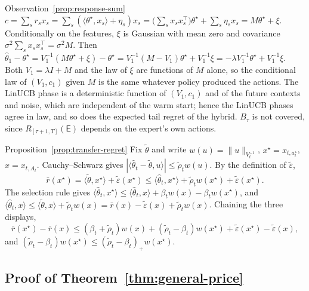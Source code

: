 \documentclass[anon]{alt2027} %
\newcommand{\Exp}{\mathsf{E}}
\newcommand{\wid}{w}
\begin{document}
\begin{proofof}{Observation~\ref{prop:response-sum}}
$c=\sum_sr_sx_s=\sum_s(\langle\theta^\star,x_s\rangle+\eta_s)x_s
=\bigl(\sum_sx_sx_s^\top\bigr)\theta^\star+\sum_s\eta_sx_s=M\theta^\star+\xi$.
Conditionally on the features, $\xi$ is Gaussian with mean zero and covariance
$\sigma^2\sum_sx_sx_s^\top=\sigma^2M$. Then
$\widehat\theta_1-\theta^\star=V_1^{-1}(M\theta^\star+\xi)-\theta^\star
=V_1^{-1}(M-V_1)\theta^\star+V_1^{-1}\xi=-\lambda V_1^{-1}\theta^\star+V_1^{-1}\xi$.
Both $V_1=\lambda I+M$ and the law of $\xi$ are functions of $M$ alone, so the
conditional law of $(V_1,c_1)$ given $M$ is the same whatever policy produced
the actions. The LinUCB phase is a deterministic function of $(V_1,c_1)$ and of
the future contexts and noise, which are independent of the warm start; hence
the LinUCB phases agree in law, and so does the expected tail regret of the
hybrid. $B_\tau$ is not covered, since $R_{[\tau+1,T]}(\Exp)$ depends on the
expert's own actions.
\end{proofof}

\begin{proofof}{Proposition~\ref{prop:transfer-regret}}
Fix $\widetilde\theta$ and write $\wid(u)=\|u\|_{V_t^{-1}}$,
$x^\star=x_{t,a^\star_t}$, $x=x_{t,A_t}$. Cauchy--Schwarz gives
$|\langle\widehat\theta_t-\widetilde\theta,u\rangle|\le\widetilde\rho_t\wid(u)$.
By the definition of $\widetilde\varepsilon$,
\[
\bar r(x^\star)=\langle\widetilde\theta,x^\star\rangle+\widetilde\varepsilon(x^\star)
\le\langle\widehat\theta_t,x^\star\rangle+\widetilde\rho_t\wid(x^\star)+\widetilde\varepsilon(x^\star).
\]
The selection rule gives
$\langle\widehat\theta_t,x^\star\rangle\le\langle\widehat\theta_t,x\rangle+\beta_t\wid(x)-\beta_t\wid(x^\star)$,
and
$\langle\widehat\theta_t,x\rangle\le\langle\widetilde\theta,x\rangle+\widetilde\rho_t\wid(x)
=\bar r(x)-\widetilde\varepsilon(x)+\widetilde\rho_t\wid(x)$.
Chaining the three displays,
\[
\bar r(x^\star)-\bar r(x)\le(\beta_t+\widetilde\rho_t)\wid(x)
+(\widetilde\rho_t-\beta_t)\wid(x^\star)
+\widetilde\varepsilon(x^\star)-\widetilde\varepsilon(x),
\]
and $(\widetilde\rho_t-\beta_t)\wid(x^\star)\le(\widetilde\rho_t-\beta_t)_+\wid(x^\star)$.
\end{proofof}

\subsection{Proof of Theorem~\ref{thm:general-price}}
\label{app:proof-general-price}
\end{document}

